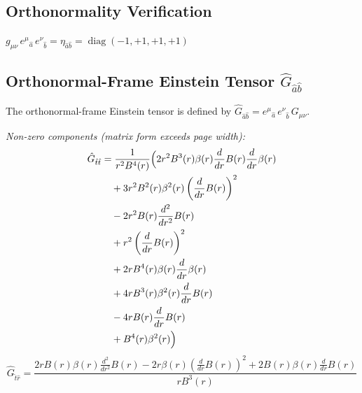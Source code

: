 \documentclass[11pt,a4paper]{article}
\begin{document}
\subsection{Orthonormality Verification}
\begin{tcolorbox}[colback=green!8!white,colframe=green!50!black,title=Orthonormality Verified]
$g_{\mu\nu}\,e^\mu{}_{\hat{a}}\,e^\nu{}_{\hat{b}} = \eta_{\hat{a}\hat{b}} = \operatorname{diag}(-1,+1,+1,+1)$ \quad\textbf{\large\checkmark}
\end{tcolorbox}
\subsection{Orthonormal-Frame Einstein Tensor $\hat{G}_{\hat{a}\hat{b}}$}
The orthonormal-frame Einstein tensor is defined by $\hat{G}_{\hat{a}\hat{b}} = e^\mu{}_{\hat{a}}\,e^\nu{}_{\hat{b}}\,G_{\mu\nu}$.
\par\noindent\textit{Non-zero components (matrix form exceeds page width):}
\begin{align*}
  \hat{G}_{\hat{t}\hat{t}} &= \frac{1}{r^{2} B^{4}{\left(r \right)}}\Bigl(2 r^{2} B^{3}{\left(r \right)} \beta{\left(r \right)} \frac{d}{d r} B{\left(r \right)} \frac{d}{d r} \beta{\left(r \right)} \\
  &\quad + 3 r^{2} B^{2}{\left(r \right)} \beta^{2}{\left(r \right)} \left(\frac{d}{d r} B{\left(r \right)}\right)^{2} \\
  &\quad - 2 r^{2} B{\left(r \right)} \frac{d^{2}}{d r^{2}} B{\left(r \right)} \\
  &\quad + r^{2} \left(\frac{d}{d r} B{\left(r \right)}\right)^{2} \\
  &\quad + 2 r B^{4}{\left(r \right)} \beta{\left(r \right)} \frac{d}{d r} \beta{\left(r \right)} \\
  &\quad + 4 r B^{3}{\left(r \right)} \beta^{2}{\left(r \right)} \frac{d}{d r} B{\left(r \right)} \\
  &\quad - 4 r B{\left(r \right)} \frac{d}{d r} B{\left(r \right)} \\
  &\quad + B^{4}{\left(r \right)} \beta^{2}{\left(r \right)}\Bigr)
\end{align*}
\begin{dmath*}
  \hat{G}_{\hat{t}\hat{r}} = \frac{2 r B{\left(r \right)} \beta{\left(r \right)} \frac{d^{2}}{d r^{2}} B{\left(r \right)} - 2 r \beta{\left(r \right)} \left(\frac{d}{d r} B{\left(r \right)}\right)^{2} + 2 B{\left(r \right)} \beta{\left(r \right)} \frac{d}{d r} B{\left(r \right)}}{r B^{3}{\left(r \right)}}
\end{dmath*}
\end{document}
